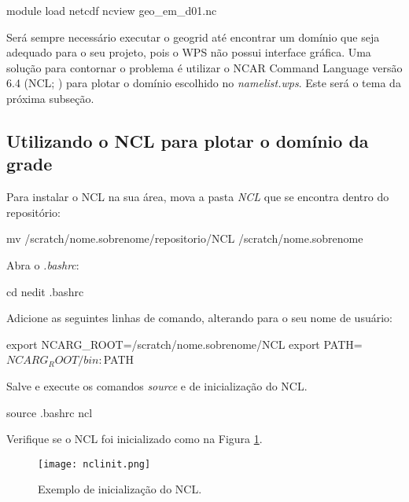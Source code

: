 \begin{bashcode}
module load netcdf
ncview geo_em_d01.nc
\end{bashcode}
\bigskip

\noindent Será sempre necessário executar o geogrid até encontrar um domínio que seja adequado para o seu projeto, pois o WPS não possui interface gráfica. Uma solução para contornar o problema é utilizar o NCAR Command Language versão 6.4 (NCL; \cite{Ncl2017}) para plotar o domínio escolhido no \textit{namelist.wps}.  Este será o tema da próxima subseção.
\bigskip

\subsection{Utilizando o NCL para plotar o domínio da grade}
\bigskip

\noindent Para instalar o NCL na sua área, mova a pasta \textit{NCL} que se encontra dentro do repositório:
\bigskip

\begin{bashcode}
mv /scratch/nome.sobrenome/repositorio/NCL /scratch/nome.sobrenome
\end{bashcode}
\bigskip

\noindent Abra o \textit{.bashrc}:
\bigskip

\begin{bashcode}
cd
nedit .bashrc
\end{bashcode}
\bigskip

\noindent Adicione as seguintes linhas de comando, alterando para o seu nome de usuário:
\bigskip

\begin{bashcode}
export NCARG_ROOT=/scratch/nome.sobrenome/NCL
export PATH=$NCARG_ROOT/bin:$PATH
\end{bashcode}
\bigskip

\noindent Salve e execute os comandos \textit{source} e de inicialização do NCL.
\bigskip

\begin{bashcode}
source .bashrc
ncl
\end{bashcode}
\bigskip

\noindent Verifique se o NCL foi inicializado como na Figura \ref{nclinit}.
\bigskip

\begin{figure}[H]
    \centering
    \texttt{[image: nclinit.png]}
    \caption{Exemplo de inicialização do NCL.}
    \label{nclinit}
\end{figure}
\bigskip


